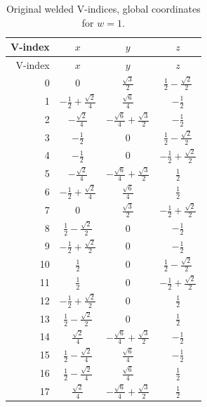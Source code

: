 \begin{longtable}{@{}rccc@{}}\caption{Original welded V-indices, global coordinates for $w=1$.}\label{tab:coords}\\\toprule V-index & $x$ & $y$ & $z$\\\midrule\endfirsthead\toprule V-index & $x$ & $y$ & $z$\\\midrule\endhead
0 & $0$ & $\frac{\sqrt{3}}{2}$ & $\frac{1}{2} - \frac{\sqrt{2}}{2}$ \\[5pt]
1 & $- \frac{1}{2} + \frac{\sqrt{2}}{4}$ & $\frac{\sqrt{6}}{4}$ & $- \frac{1}{2}$ \\[5pt]
2 & $- \frac{\sqrt{2}}{4}$ & $- \frac{\sqrt{6}}{4} + \frac{\sqrt{3}}{2}$ & $- \frac{1}{2}$ \\[5pt]
3 & $- \frac{1}{2}$ & $0$ & $\frac{1}{2} - \frac{\sqrt{2}}{2}$ \\[5pt]
4 & $- \frac{1}{2}$ & $0$ & $- \frac{1}{2} + \frac{\sqrt{2}}{2}$ \\[5pt]
5 & $- \frac{\sqrt{2}}{4}$ & $- \frac{\sqrt{6}}{4} + \frac{\sqrt{3}}{2}$ & $\frac{1}{2}$ \\[5pt]
6 & $- \frac{1}{2} + \frac{\sqrt{2}}{4}$ & $\frac{\sqrt{6}}{4}$ & $\frac{1}{2}$ \\[5pt]
7 & $0$ & $\frac{\sqrt{3}}{2}$ & $- \frac{1}{2} + \frac{\sqrt{2}}{2}$ \\[5pt]
8 & $\frac{1}{2} - \frac{\sqrt{2}}{2}$ & $0$ & $- \frac{1}{2}$ \\[5pt]
9 & $- \frac{1}{2} + \frac{\sqrt{2}}{2}$ & $0$ & $- \frac{1}{2}$ \\[5pt]
10 & $\frac{1}{2}$ & $0$ & $\frac{1}{2} - \frac{\sqrt{2}}{2}$ \\[5pt]
11 & $\frac{1}{2}$ & $0$ & $- \frac{1}{2} + \frac{\sqrt{2}}{2}$ \\[5pt]
12 & $- \frac{1}{2} + \frac{\sqrt{2}}{2}$ & $0$ & $\frac{1}{2}$ \\[5pt]
13 & $\frac{1}{2} - \frac{\sqrt{2}}{2}$ & $0$ & $\frac{1}{2}$ \\[5pt]
14 & $\frac{\sqrt{2}}{4}$ & $- \frac{\sqrt{6}}{4} + \frac{\sqrt{3}}{2}$ & $- \frac{1}{2}$ \\[5pt]
15 & $\frac{1}{2} - \frac{\sqrt{2}}{4}$ & $\frac{\sqrt{6}}{4}$ & $- \frac{1}{2}$ \\[5pt]
16 & $\frac{1}{2} - \frac{\sqrt{2}}{4}$ & $\frac{\sqrt{6}}{4}$ & $\frac{1}{2}$ \\[5pt]
17 & $\frac{\sqrt{2}}{4}$ & $- \frac{\sqrt{6}}{4} + \frac{\sqrt{3}}{2}$ & $\frac{1}{2}$ \\[5pt]
\bottomrule\end{longtable}